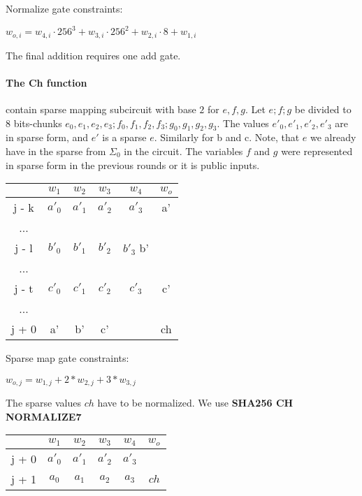 Normalize gate constraints:
\begin{center}
$w_{o,i} = w_{4,i} \cdot 256^3 + w_{3,i} \cdot 256^2 + w_{2,i} \cdot 8 + w_{1,i}$ \\
\end{center}

The final addition requires one add gate.

\paragraph{The Ch function}
contain sparse mapping subcircuit with base $2$ for $e, f ,g$.
Let $e; f; g$ be divided to 8 bits-chunks $e_0, e_1, e_2, e_3; f_0, f_1, f_2, f_3; g_0, g_1, g_2, g_3$.
The values $e'_0, e'_1, e'_2, e'_3$ are in sparse form, and $e'$ is a sparse $e$.
Similarly for b and c. 
Note, that $e$ we already have in the sparse from $\Sigma_0$ in the circuit. 
The variables $f$ and $g$ were represented in sparse form in the previous rounds or it is public inputs.
\begin{center}
\begin{tabular}{ c|c|c|c|c|c } 
  & $w_1$ & $w_2$ & $w_3$ & $w_4$ & $w_o$\\ 
 \hline 
j - k & $a'_0$ & $a'_1$ & $a'_2$ & $a'_3$ & a' \\ 
... & & & & \\
j - l & $b'_0$ & $b'_1$ & $b'_2$ & $b'_3$ b'&\\ 
... & & & & \\
j - t & $c'_0$ & $c'_1$ & $c'_2$ & $c'_3$ & c' \\ 
... & & & & \\
j + 0 & a' & b' & c' & & ch\\
\end{tabular}
\end{center}
Sparse map gate constraints:
\begin{center}
$w_{o, j} = w_{1,j} + 2*w_{2, j} + 3*w_{3, j}$ \\
\end{center}

The sparse values $ch$ have to be normalized.
We use \textbf{SHA256 CH NORMALIZE7}
\begin{center}
\begin{tabular}{ c|c|c|c|c|c } 
  & $w_1$ & $w_2$ & $w_3$ & $w_4$ & $w_o$\\ 
 \hline
j + 0 & $a'_0$ & $a'_1$ & $a'_2$ & $a'_3$ &\\ 
j + 1 & $a_0$ & $ a_1$ & $a_2$ & $a_3$ &  $ch$ \\ 
\end{tabular}
\end{center}

